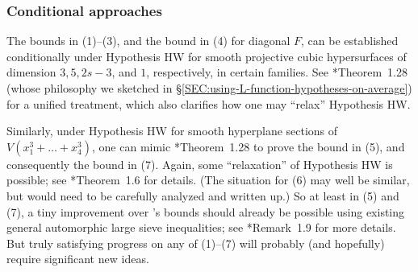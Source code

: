 \documentclass[12pt]{report}
\begin{document}



\subsubsection{Conditional approaches}

The bounds in (1)--(3),
and the bound in (4) for diagonal $F$,
can be established conditionally under
Hypothesis HW for smooth projective cubic hypersurfaces of dimension
$3,5,2s-3$,
and $1$,
respectively,
in certain families.
See \cite{wang2021_large_sieve_diagonal_cubic_forms}*{Theorem~1.28} (whose philosophy we sketched in \S\ref{SEC:using-L-function-hypotheses-on-average}) for a unified treatment,
which also clarifies how one may ``relax'' Hypothesis HW.

Similarly,
under Hypothesis HW for smooth hyperplane sections of $V(x_1^3+\dots+x_4^3)$,
one can mimic \cite{wang2021_large_sieve_diagonal_cubic_forms}*{Theorem~1.28} to prove the bound in (5),
and consequently the bound in (7).
Again,
some ``relaxation'' of Hypothesis HW is possible;
see \cite{restricted_cubic_moments}*{Theorem~1.6} for details.
(The situation for (6) may well be similar,
but would need to be carefully analyzed and written up.)
So at least in (5) and (7),
a tiny improvement over \cite{brudern1991ternary}'s bounds should already be possible using existing general automorphic large sieve inequalities;
see \cite{restricted_cubic_moments}*{Remark~1.9} for more details.
But truly satisfying progress on any of (1)--(7) will probably (and hopefully) require significant new ideas.
\end{document}
